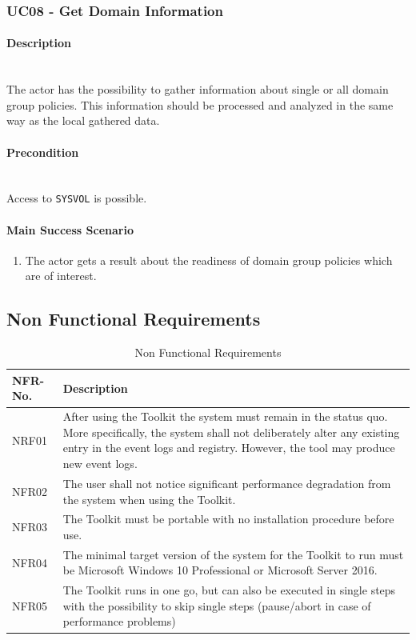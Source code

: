 \subsubsection{UC08 - Get Domain Information}\label{UC08}
\begin{tcolorbox}
    \paragraph{Description} \ \\
    The actor has the possibility to gather information about single or all domain group policies. This information should be processed and analyzed in the same way as the local gathered data. 
    \ \\
    \paragraph{Precondition} \ \\
    Access to \lstinline|SYSVOL| is possible.
    \ \\
    \paragraph{Main Success Scenario} 
    \begin{enumerate}
        \item The actor gets a result about the readiness of domain group policies which are of interest.
    \end{enumerate}   
\end{tcolorbox}

\subsection{Non Functional Requirements}

\begin{table}[H]
    \centering
    \def\arraystretch{2}
    \begin{tabular}{| p{2.5cm} | p{13.5cm} |} \hline
        \textbf{NFR-No.} & \textbf{Description}  \\ \hline
        NRF01 & After using the Toolkit the system must remain in the status quo. More specifically, the system shall not deliberately alter any existing entry in the event logs and registry. However, the tool may produce new event logs.\\ \hline
        NFR02 & The user shall not notice significant performance degradation from the system when using the Toolkit. \\ \hline
        NFR03 & The Toolkit must be portable with no installation procedure before use. \\ \hline
        NFR04 & The minimal target version of the system for the Toolkit to run must be Microsoft Windows 10 Professional or Microsoft Server 2016. \\ \hline
        NFR05 & The Toolkit runs in one go, but can also be executed in single steps with the possibility to skip single steps (pause/abort in case of performance problems) \\ \hline
    \end{tabular}
    \caption{Non Functional Requirements}
\end{table}

